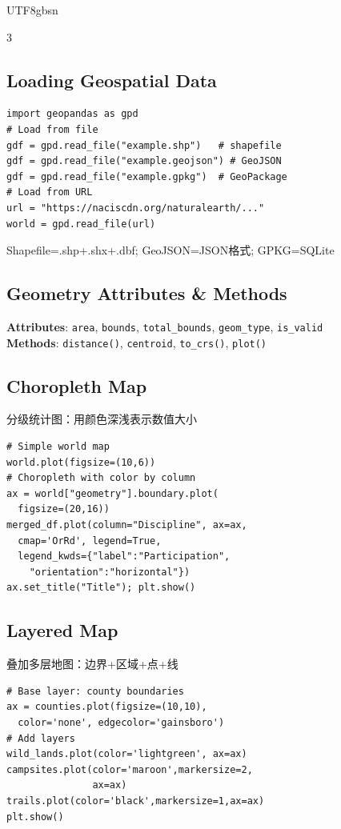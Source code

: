 \documentclass[9pt,landscape,a4paper]{article}
\newcommand{\zhint}[1]{{\scriptsize\color{gray!70!black}#1}}
\begin{document}
\begin{CJK}{UTF8}{gbsn}
\begin{multicols}{3}
\subsection{Loading Geospatial Data}
\begin{lstlisting}
import geopandas as gpd
# Load from file
gdf = gpd.read_file("example.shp")   # shapefile
gdf = gpd.read_file("example.geojson") # GeoJSON
gdf = gpd.read_file("example.gpkg")  # GeoPackage
# Load from URL
url = "https://naciscdn.org/naturalearth/..."
world = gpd.read_file(url)
\end{lstlisting}
\zhint{Shapefile=.shp+.shx+.dbf; GeoJSON=JSON格式; GPKG=SQLite}

\subsection{Geometry Attributes \& Methods}
\textbf{Attributes}: \texttt{area}, \texttt{bounds}, \texttt{total\_bounds}, \texttt{geom\_type}, \texttt{is\_valid}\\
\textbf{Methods}: \texttt{distance()}, \texttt{centroid}, \texttt{to\_crs()}, \texttt{plot()}

\subsection{Choropleth Map}
\zhint{分级统计图：用颜色深浅表示数值大小}
\begin{lstlisting}
# Simple world map
world.plot(figsize=(10,6))
# Choropleth with color by column
ax = world["geometry"].boundary.plot(
  figsize=(20,16))
merged_df.plot(column="Discipline", ax=ax,
  cmap='OrRd', legend=True,
  legend_kwds={"label":"Participation",
    "orientation":"horizontal"})
ax.set_title("Title"); plt.show()
\end{lstlisting}

\subsection{Layered Map}
\zhint{叠加多层地图：边界+区域+点+线}
\begin{lstlisting}
# Base layer: county boundaries
ax = counties.plot(figsize=(10,10),
  color='none', edgecolor='gainsboro')
# Add layers
wild_lands.plot(color='lightgreen', ax=ax)
campsites.plot(color='maroon',markersize=2,
               ax=ax)
trails.plot(color='black',markersize=1,ax=ax)
plt.show()
\end{lstlisting}


\end{multicols}
\end{CJK}
\end{document}
